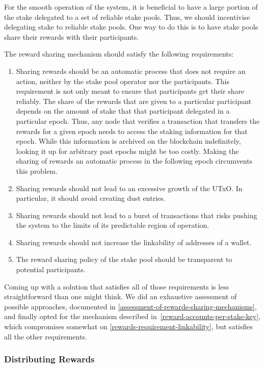 \documentclass[11pt,a4paper]{article}
\begin{document}
For the smooth operation of the system, it is beneficial to have a large
portion of the stake delegated to a set of reliable stake pools. Thus,
we should incentivise delegating stake to reliable stake pools. One way
to do this is to have stake pools share their rewards with their
participants.

The reward sharing mechanism should satisfy the following requirements:

\begin{enumerate}
\item
  Sharing rewards should be an automatic process that does not require
  an action, neither by the stake pool operator nor the participants.
  This requirement is not only meant to ensure that participants get
  their share reliably. The share of the rewards that are given to a
  particular participant depends on the amount of stake that that
  participant delegated in a particular epoch. Thus, any node that
  verifies a transaction that transfers the rewards for a given epoch
  needs to access the staking information for that epoch. While this
  information is archived on the blockchain indefinitely, looking it up
  for arbitrary past epochs might be too costly. Making the sharing of
  rewards an automatic process in the following epoch circumvents this
  problem.
\item
  Sharing rewards should not lead to an excessive growth of the UTxO. In
  particular, it should avoid creating dust entries.
\item
  Sharing rewards should not lead to a burst of transactions that risks
  pushing the system to the limits of its predictable region of
  operation.
\item\label{rewards-requirement-linkability}
  Sharing rewards should not increase the linkability of addresses of a
  wallet.
\item
  The reward sharing policy of the stake pool should be transparent to
  potential participants.
\end{enumerate}

Coming up with a solution that satisfies all of those requirements is
less straightforward than one might think. We did an exhaustive
assessment of possible approaches, documented in
\cref{assessment-of-rewards-sharing-mechanisms}, and finally opted for
the mechanism described in~\ref{reward-accounts-per-stake-key}, which
compromises somewhat on \cref{rewards-requirement-linkability}, but
satisfies all the other requirements.

\subsubsection{Distributing Rewards}
\label{distributing-rewards}
\end{document}
